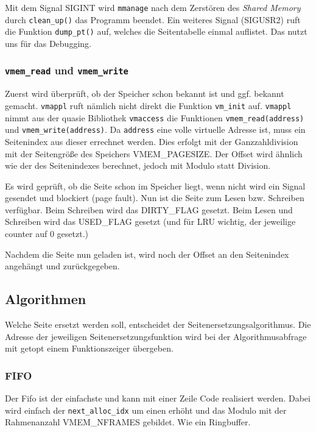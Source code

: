 \documentclass[
   draft=false
  ,paper=a4
  ,twoside=false
  ,fontsize=11pt
  ,headsepline
  ,BCOR10mm
  ,DIV11
  ,parskip=full+
]{scrartcl} %
\begin{document}
        Mit dem Signal SIGINT wird \texttt{mmanage} nach dem Zerstören des
        \textit{Shared Memory} durch \texttt{clean\_up()} das Programm beendet.
        Ein weiteres Signal (SIGUSR2) ruft die Funktion \texttt{dump\_pt()}
        auf, welches die Seitentabelle einmal auflistet. Das nutzt uns für das
        Debugging. 
        
        \subsubsection{\texttt{vmem\_read} und \texttt{vmem\_write}}
        Zuerst wird überprüft, ob der Speicher schon bekannt ist und ggf.  bekannt gemacht. \texttt{vmappl} ruft nämlich nicht direkt
        die Funktion \texttt{vm\_init} auf.
        \texttt{vmappl} nimmt aus der quasie Bibliothek \texttt{vmaccess} die 
        Funktionen \texttt{vmem\_read(address)} und \texttt{vmem\_write(address)}.
        Da \texttt{address} eine volle virtuelle Adresse ist, muss ein 
        Seitenindex aus dieser errechnet werden. Dies erfolgt mit der 
        Ganzzahldivision mit der Seitengröße des Speichers VMEM\_PAGESIZE.
        Der Offset wird ähnlich wie der des Seitenindexes berechnet, jedoch mit
        Modulo statt Division.

        Es wird geprüft, ob die Seite schon im Speicher liegt, wenn nicht wird 
        ein Signal gesendet und blockiert (page fault). Nun ist die Seite zum
        Lesen bzw. Schreiben verfügbar. Beim Schreiben wird das DIRTY\_FLAG 
        gesetzt. Beim Lesen und Schreiben wird das USED\_FLAG gesetzt (und für
        LRU wichtig, der jeweilige counter auf 0 gesetzt.)

        Nachdem die Seite nun geladen ist, wird noch der Offset an den 
        Seitenindex angehängt und zurückgegeben. 
        
    \subsection{Algorithmen}
    Welche Seite ersetzt werden soll, entscheidet der Seitenersetzungsalgorithmus.
    Die Adresse der jeweiligen Seitenersetzungsfunktion wird bei der Algorithmusabfrage mit getopt einem Funktionszeiger übergeben.
        \subsubsection{FIFO}
        Der Fifo ist der einfachste und kann mit einer Zeile Code realisiert werden.
        Dabei wird einfach der \texttt{next\_alloc\_idx} um einen erhöht 
        und das Modulo mit der Rahmenanzahl VMEM\_NFRAMES gebildet. Wie ein Ringbuffer.
\end{document}
